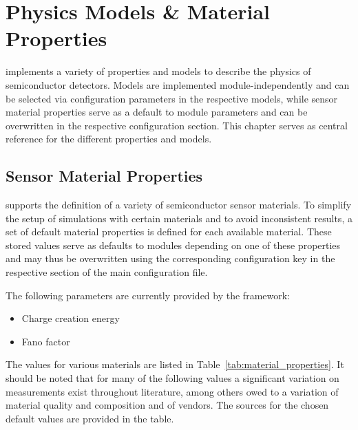 \chapter{Physics Models \& Material Properties }
\label{ch:models}

\apsq implements a variety of properties and models to describe the physics of semiconductor detectors.
Models are implemented module-independently and can be selected via configuration parameters in the respective models, while sensor material properties serve as a default to module parameters and can be overwritten in the respective configuration section.
This chapter serves as central reference for the different properties and models.

\section{Sensor Material Properties}
\label{sec:material_properties}

\apsq supports the definition of a variety of semiconductor sensor materials.
To simplify the setup of simulations with certain materials and to avoid inconsistent results, a set of default material properties is defined for each available material.
These stored values serve as defaults to modules depending on one of these properties and may thus be overwritten using the corresponding configuration key in the respective section of the main configuration file.

The following parameters are currently provided by the framework:
\begin{itemize}
\item Charge creation energy
\item Fano factor
\end{itemize}

The values for various materials are listed in Table~\ref{tab:material_properties}.
It should be noted that for many of the following values a significant variation on measurements exist throughout literature, among others owed to a variation of material quality and composition and of vendors.
The sources for the chosen default values are provided in the table.


